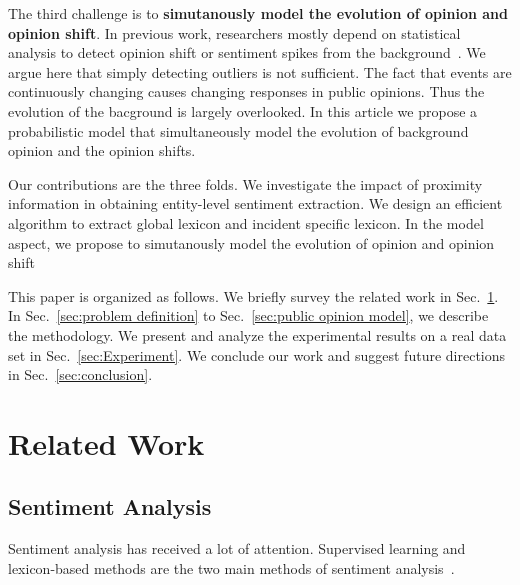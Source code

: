 \documentclass[runningheads]{llncs}
\begin{document}
The third challenge is to \textbf{simutanously model the evolution of opinion and opinion shift}.
In previous work, researchers mostly depend on statistical analysis to detect opinion shift or sentiment spikes from the background~\cite{}.
We argue here that simply detecting outliers is not sufficient.
The fact that events are continuously changing causes changing responses in public opinions.
Thus the evolution of the bacground is largely overlooked.
In this article we propose a probabilistic model that simultaneously model the evolution of background opinion and the opinion shifts.

Our contributions are the three folds. 
We investigate the impact of proximity information in obtaining entity-level sentiment extraction.
We design an efficient algorithm to extract global lexicon and incident specific lexicon.
In the model aspect, we propose to simutanously model the evolution of opinion and opinion shift

This paper is organized as follows. We briefly survey the related work in Sec.~\ref{sec:related}. In Sec.~\ref{sec:problem definition} to Sec.~\ref{sec:public opinion model}, we describe the methodology. We present and analyze the experimental results on a real data set in Sec.~\ref{sec:Experiment}. We conclude our work and suggest future directions in Sec.~\ref{sec:conclusion}.

\section{Related Work}\label{sec:related}
\subsection{Sentiment Analysis}
Sentiment analysis has received a lot of attention. Supervised learning and lexicon-based methods are the two main methods of sentiment analysis~\cite{Ahmed2017SentiCR}.
\end{document}
